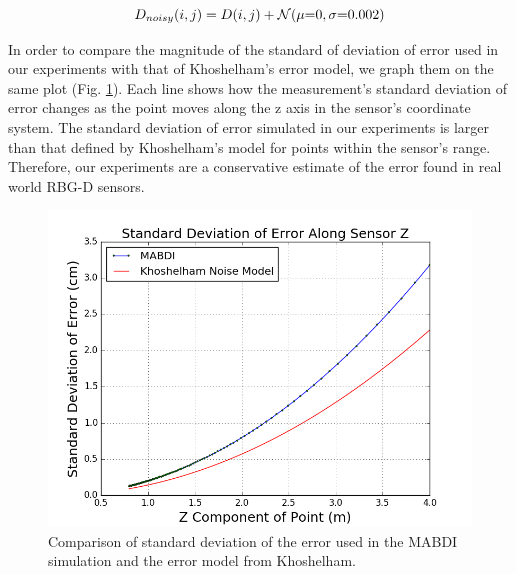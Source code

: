 \begin{equation}
  D_{noisy}(i,j) = D(i,j) + \mathcal{N} (\mu\mathsmaller{=}0, \sigma\mathsmaller{=}0.002)
  \label{eqn:depth_noise}
\end{equation}

In order to compare the magnitude of the standard of deviation of error used in
our experiments with that of Khoshelham's error model, we graph them on the same
plot (Fig. \ref{fig:depth_noise_error}). Each line shows how the measurement's
standard deviation of error changes as the point moves along the z axis in the
sensor's coordinate system. The standard deviation of error simulated in our
experiments is larger than that defined by Khoshelham's model for points within
the sensor's range. Therefore, our experiments are a conservative estimate of
the error found in real world RBG-D sensors.

\begin{figure}[h]%
\centering
  \includegraphics[width=.70\textwidth]{figures/depth_noise_error.png}
  \caption{Comparison of standard deviation of the error used in the MABDI simulation and the error model from Khoshelham.}
  \label{fig:depth_noise_error}
\end{figure}

%

